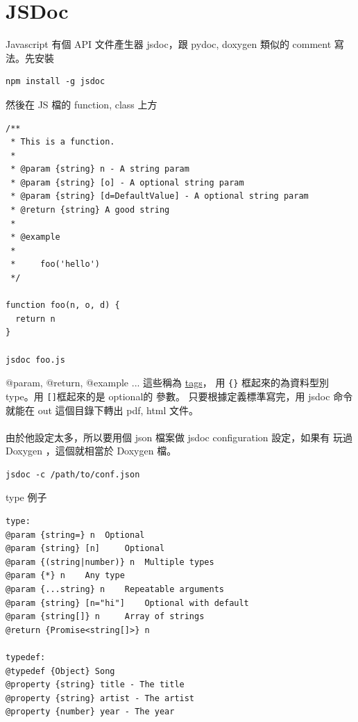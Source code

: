   \section{JSDoc}
  Javascript 有個 API 文件產生器 jsdoc，跟 pydoc, doxygen 類似的 comment
  寫法。先安裝
  \begin{verbatim}
npm install -g jsdoc
  \end{verbatim}
  然後在 JS 檔的 function, class 上方
  \begin{verbatim}
/**
 * This is a function.
 *
 * @param {string} n - A string param
 * @param {string} [o] - A optional string param
 * @param {string} [d=DefaultValue] - A optional string param
 * @return {string} A good string
 *
 * @example
 *
 *     foo('hello')
 */

function foo(n, o, d) {
  return n
}

jsdoc foo.js
  \end{verbatim}
  @param, @return, @example ... 這些稱為
  \href{https://jsdoc.app/#block-tags}{tags}，
  用 \verb={}= 框起來的為資料型別 type。用 \verb=[]=框起來的是 optional的
  參數。 只要根據定義標準寫完，用 jsdoc 命令就能在 out 這個目錄下轉出 pdf,
  html 文件。
  \\\\
  由於他設定太多，所以要用個 json 檔案做 jsdoc configuration 設定，如果有
  玩過 Doxygen ，這個就相當於 Doxygen 檔。
  \begin{verbatim}
jsdoc -c /path/to/conf.json
  \end{verbatim}
  type 例子
  \begin{verbatim}
type:
@param {string=} n 	Optional
@param {string} [n] 	Optional
@param {(string|number)} n 	Multiple types
@param {*} n 	Any type
@param {...string} n 	Repeatable arguments
@param {string} [n="hi"] 	Optional with default
@param {string[]} n 	Array of strings
@return {Promise<string[]>} n

typedef:
@typedef {Object} Song
@property {string} title - The title
@property {string} artist - The artist
@property {number} year - The year
  \end{verbatim}

